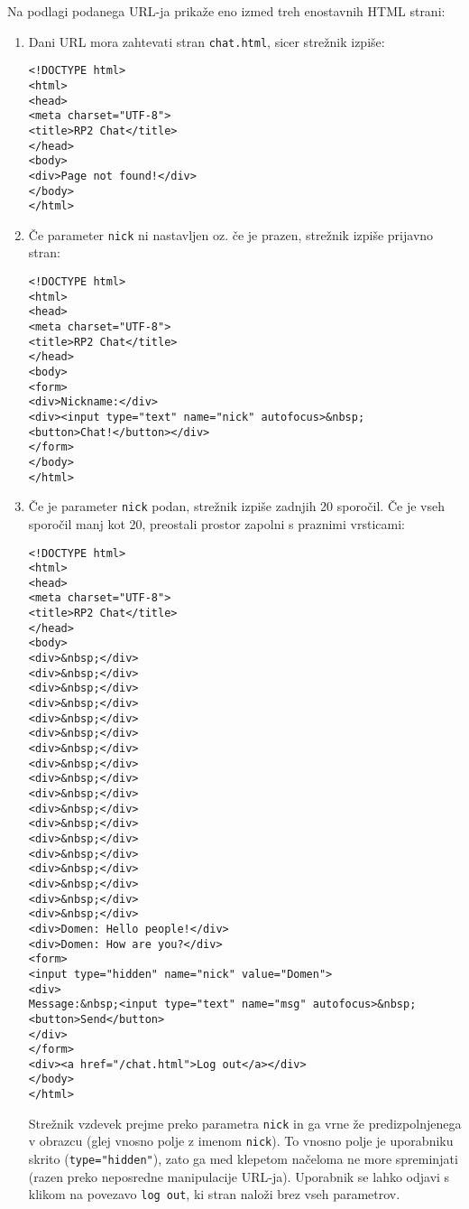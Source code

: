 \documentclass[a4paper,10pt]{article}
\begin{document}
\medskip\noindent
Na podlagi podanega URL-ja prikaže eno izmed treh enostavnih HTML strani:
\begin{enumerate}
\item Dani URL mora zahtevati stran \texttt{chat.html}, sicer strežnik izpiše:
\begin{verbatim}
<!DOCTYPE html>
<html>
<head>
<meta charset="UTF-8">
<title>RP2 Chat</title>
</head>
<body>
<div>Page not found!</div>
</body>
</html>
\end{verbatim}

\item Če parameter \texttt{nick} ni nastavljen oz. če je prazen, strežnik izpiše prijavno stran:
\begin{verbatim}
<!DOCTYPE html>
<html>
<head>
<meta charset="UTF-8">
<title>RP2 Chat</title>
</head>
<body>
<form>
<div>Nickname:</div>
<div><input type="text" name="nick" autofocus>&nbsp;
<button>Chat!</button></div>
</form>
</body>
</html>
\end{verbatim}

\newpage
\item Če je parameter \texttt{nick} podan, strežnik izpiše zadnjih 20 sporočil. Če je vseh sporočil manj kot 20, preostali prostor zapolni s praznimi vrsticami:
\begin{verbatim}
<!DOCTYPE html>
<html>
<head>
<meta charset="UTF-8">
<title>RP2 Chat</title>
</head>
<body>
<div>&nbsp;</div>
<div>&nbsp;</div>
<div>&nbsp;</div>
<div>&nbsp;</div>
<div>&nbsp;</div>
<div>&nbsp;</div>
<div>&nbsp;</div>
<div>&nbsp;</div>
<div>&nbsp;</div>
<div>&nbsp;</div>
<div>&nbsp;</div>
<div>&nbsp;</div>
<div>&nbsp;</div>
<div>&nbsp;</div>
<div>&nbsp;</div>
<div>&nbsp;</div>
<div>&nbsp;</div>
<div>&nbsp;</div>
<div>Domen: Hello people!</div>
<div>Domen: How are you?</div>
<form>
<input type="hidden" name="nick" value="Domen">
<div>
Message:&nbsp;<input type="text" name="msg" autofocus>&nbsp;
<button>Send</button>
</div>
</form>
<div><a href="/chat.html">Log out</a></div>
</body>
</html>
\end{verbatim}
Strežnik vzdevek prejme preko parametra \texttt{nick} in ga vrne že predizpolnjenega v obrazcu (glej vnosno polje z imenom \texttt{nick}). To vnosno polje je uporabniku skrito (\texttt{type="hidden"}), zato ga med klepetom načeloma ne more spreminjati (razen preko neposredne manipulacije URL-ja). Uporabnik se lahko odjavi s klikom na povezavo \texttt{log out}, ki stran naloži brez vseh parametrov.

\end{enumerate}
\end{document}
